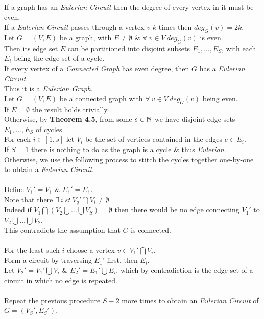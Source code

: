 \documentclass[11pt,a4paper]{article}
\begin{document}
If a graph has an \textit{Eulerian Circuit} then the degree of every vertex in it must be even.\\

If a \textit{Eulerian Circuit} passes through a vertex $v$ $k$ times then $deg_G(v)=2k$.\\

Let $G=(V,E)$ be a graph, with $E\neq\emptyset$ \& $\forall\ v\in V\ deg_G(v)$ is even.\\
Then its edge set $E$ can be partitioned into disjoint subsets $E_1,\dots,E_S$, with each $E_i$ being the edge set of a cycle.\\

If every vertex of a \textit{Connected Graph} has even degree, then $G$ has a \textit{Eulerian Circuit}.\\
Thus it is a \textit{Eulerian Graph}.\\

Let $G=(V,E)$ be a connected graph with $\forall\ v\in V\ deg_G(v)$ being even.\\
If $E=\emptyset$ the result holds trivially.\\
Otherwise, by \textbf{Theorem 4.5}, from some $s\in\mathbb{N}$ we have disjoint edge sets $E_1,\dots,E_S$ of cycles.\\
For each $i\in[1,s]$ let $V_i$ be the set of vertices contained in the edges $e\in E_i$.\\
If $S=1$ there is nothing to do as the graph is a cycle \& thus \textit{Eulerian}.\\
Otherwise, we use the following process to stitch the cycles together one-by-one to obtain a \textit{Eulerian Circuit}.\\
\\
Define $V_1'=V_1$ \& $E_1'=E_1$.\\
Note that there $\exists\ i\ st\ V_q'\bigcap V_i\neq\emptyset$.\\
Indeed if $V_1\bigcap(V_2\bigcup\dots\bigcup V_S)=\emptyset$ then there would be no edge connecting $V_1'$ to $V_2\bigcup\dots\bigcup V_2$.\\ 
This contradicts the assumption that $G$ is connected.\\
\\
For the least such $i$ choose a vertex $v\in V_1'\bigcap V_i$.\\
Form a circuit by traversing $E_1'$ first, then $E_i$.\\
Let $V_2'=V_1'\bigcup V_i$ \& $E_2'=E_1'\bigcup E_i$, which by contradiction is the edge set of a circuit in which no edge is repeated.\\
\\
Repeat the previous procedure $S-2$ more times to obtain an \textit{Eulerian Circuit} of $G=(V_S',E_S')$.\\
\end{document}
